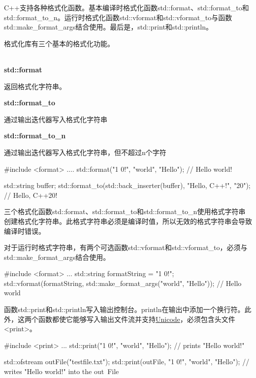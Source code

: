 C++支持各种格式化函数。基本编译时格式化函数std::format、std::format\_to和std::format\_to\_n。运行时格式化函数std::vformat和std::vformat\_to与函数std::make\_format\_args结合使用。最后是，std::print和std::println。

格式化库有三个基本的格式化功能。

\noindent
\\\textbf{std::format}

返回格式化字符串。

\noindent
\textbf{std::format\_to}

通过输出迭代器写入格式化字符串

\noindent
\textbf{std::format\_to\_n}

通过输出迭代器写入格式化字符串，但不超过n个字符 \\

\begin{cpp}
#include <format>
....
std::format("{1} {0}!", "world", "Hello"); // Hello world!

std::string buffer;
std::format_to(std::back_inserter(buffer),
	"Hello, C++{}!\n", "20"); // Hello, C++20!
\end{cpp}


三个格式化函数std::format、std::format\_to和std::format\_to\_n使用格式字符串创建格式化字符串。此格式字符串必须是编译时值，所以无效的格式字符串会导致编译时错误。

对于运行时格式字符串，有两个可选函数std::vformat和std::vformat\_to，必须与std::make\_format\_args结合使用。

\begin{cpp}
#include <format>
...
std::string formatString = "{1} {0}!";
std::vformat(formatString, std::make_format_args("world", "Hello")); // Hello world
\end{cpp}


函数std::print和std::println写入输出控制台。println在输出中添加一个换行符。此外，这两个函数都使它能够写入输出文件流并支持\href{https://en.wikipedia.org/wiki/Unicode}{Unicode}，必须包含头文件<print>。

\begin{cpp}
#include <print>
...
std::print("{1} {0}!", "world", "Hello"); // prints "Hello world!"

std::ofstream outFile("testfile.txt");
std::print(outFile, "{1} {0}!", "world", "Hello"); // writes "Hello world!" into the out\
File
\end{cpp}

